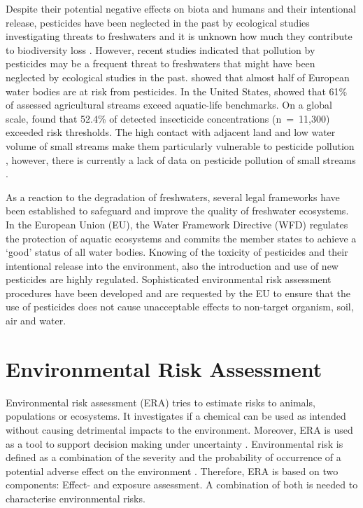Despite their potential negative effects on biota and humans and their intentional release, pesticides have been neglected in the past by ecological studies investigating threats to freshwaters \citep{schafer_contribution_2016} and it is unknown how much they contribute to biodiversity loss \citep{rockstrom_safe_2009, persson_confronting_2013}. 
However, recent studies indicated that pollution by pesticides may be a frequent threat to freshwaters that might have been neglected by ecological studies in the past.
\citet{malaj_organic_2014} showed that almost half of European water bodies are at risk from pesticides. 
In the United States, \citet{stone_pesticides_2014} showed that 61\% of assessed agricultural streams exceed aquatic-life benchmarks.
On a global scale, \citet{stehle_pesticide_2015} found that 52.4\% of detected insecticide concentrations (n~=~11,300) exceeded risk thresholds.
The high contact with adjacent land and low water volume of small streams make them particularly vulnerable to pesticide pollution \citep{biggs_importance_2016}, however, there is currently a lack of data on pesticide pollution of small streams \citep{lorenz_specifics_2016}. 

As a reaction to the degradation of freshwaters, several legal frameworks have been established to safeguard and improve the quality of freshwater ecosystems. 
In the European Union (EU), the Water Framework Directive (WFD) \citep{european_union_directive_2000} regulates the protection of aquatic ecosystems and commits the member states to achieve a `good' status of all water bodies. 
Knowing of the toxicity of pesticides and their intentional release into the environment, also the introduction and use of new pesticides are highly regulated.
Sophisticated environmental risk assessment procedures have been developed and are requested by the EU \citep{european_union_regulation_2009} to ensure that the use of pesticides does not cause unacceptable effects to non-target organism, soil, air and water. 



\section{Environmental Risk Assessment}

Environmental risk assessment (ERA) tries to estimate risks to animals, populations or ecosystems.
It investigates if a chemical can be used as intended without causing detrimental impacts to the environment. 
Moreover, ERA is used as a tool to support decision making under uncertainty \citep{newman_fundamentals_2015}. 
Environmental risk is defined as a combination of the severity and the probability of occurrence of a potential adverse effect on the environment \citep{suter_ecological_2007}. 
Therefore, ERA is based on two components: Effect- and exposure assessment.
A combination of both is needed to characterise environmental risks.

